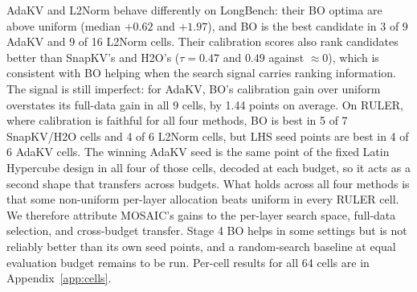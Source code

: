 \documentclass[11pt]{article}
\begin{document}
AdaKV and L2Norm behave differently on LongBench: their BO optima are above uniform (median $+0.62$ and $+1.97$), and BO is the best candidate in 3 of 9 AdaKV and 9 of 16 L2Norm cells. Their calibration scores also rank candidates better than SnapKV's and H2O's ($\tau = 0.47$ and $0.49$ against $\approx 0$), which is consistent with BO helping when the search signal carries ranking information. The signal is still imperfect: for AdaKV, BO's calibration gain over uniform overstates its full-data gain in all 9 cells, by 1.44 points on average. On RULER, where calibration is faithful for all four methods, BO is best in 5 of 7 SnapKV/H2O cells and 4 of 6 L2Norm cells, but LHS seed points are best in 4 of 6 AdaKV cells. The winning AdaKV seed is the same point of the fixed Latin Hypercube design in all four of those cells, decoded at each budget, so it acts as a second shape that transfers across budgets. What holds across all four methods is that some non-uniform per-layer allocation beats uniform in every RULER cell. We therefore attribute MOSAIC's gains to the per-layer search space, full-data selection, and cross-budget transfer. Stage 4 BO helps in some settings but is not reliably better than its own seed points, and a random-search baseline at equal evaluation budget remains to be run. Per-cell results for all 64 cells are in Appendix~\ref{app:cells}.
\end{document}
